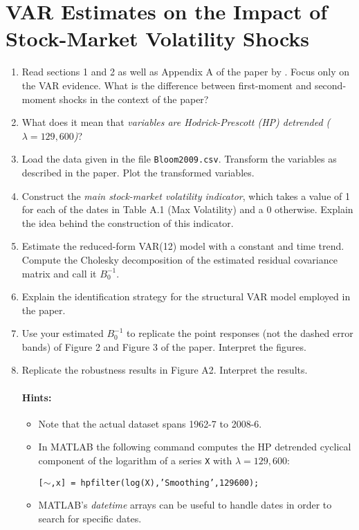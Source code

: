 \documentclass{article}
\begin{document}
\newpage

\section[VAR Estimates on the Impact of Stock-Market Volatility Shocks]{VAR Estimates on the Impact of Stock-Market Volatility Shocks}

\begin{enumerate}
\item Read sections 1 and 2 as well as Appendix A of the paper by \textcite{Bloom_2009_ImpactUncertaintyShocks}.
Focus only on the VAR evidence.
What is the difference between first-moment and second-moment shocks in the context of the paper?

\item What does it mean that \emph{variables are Hodrick-Prescott (HP) detrended (\(\lambda=129,600\))}?

\item Load the data given in the file \texttt{Bloom2009.csv}. Transform the variables as described in the paper.
Plot the transformed variables.

\item Construct the \emph{main stock-market volatility indicator},
  which takes a value of 1 for each of the dates in Table A.1 (Max Volatility) and a 0 otherwise.
Explain the idea behind the construction of this indicator.

\item Estimate the reduced-form VAR(12) model with a constant and time trend.
Compute the Cholesky decomposition of the estimated residual covariance matrix
  and call it \(B_{0}^{-1}\).

\item Explain the identification strategy for the structural VAR model employed in the paper.

\item Use your estimated \(B_{0}^{-1}\) to replicate the point responses (not the dashed error bands) of Figure 2 and Figure 3 of the paper.
Interpret the figures.

\item Replicate the robustness results in Figure A2.
Interpret the results.

\paragraph{Hints:}
\begin{itemize}
\item Note that the actual dataset spans 1962-7 to 2008-6.
\item In MATLAB the following command computes the HP detrended cyclical component of the logarithm of a series \texttt{X} with \(\lambda=129,600\):\\
\begin{center}\texttt{[\(\sim\),x] = hpfilter(log(X),'Smoothing',129600);}\end{center}
\item MATLAB's \emph{datetime} arrays can be useful to handle dates in order to search for specific dates.
\end{itemize}


\end{enumerate}
\end{document}
